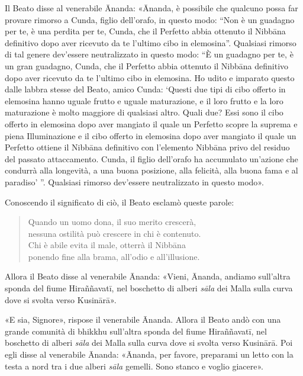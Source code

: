 Il Beato disse al venerabile Ānanda: «Ānanda, è possibile che qualcuno possa far
provare rimorso a Cunda, figlio dell’orafo, in questo modo: “Non è un guadagno
per te, è una perdita per te, Cunda, che il Perfetto abbia ottenuto il Nibbāna
definitivo dopo aver ricevuto da te l’ultimo cibo in elemosina”. Qualsiasi
rimorso di tal genere dev’essere neutralizzato in questo modo: “È un guadagno
per te, è un gran guadagno, Cunda, che il Perfetto abbia ottenuto il Nibbāna
definitivo dopo aver ricevuto da te l’ultimo cibo in elemosina. Ho udito e
imparato questo dalle labbra stesse del Beato, amico Cunda: ‘Questi due tipi di
cibo offerto in elemosina hanno uguale frutto e uguale maturazione, e il loro
frutto e la loro maturazione è molto maggiore di qualsiasi altro. Quali due?
Essi sono il cibo offerto in elemosina dopo aver mangiato il quale un Perfetto
scopre la suprema e piena Illuminazione e il cibo offerto in elemosina dopo aver
mangiato il quale un Perfetto ottiene il Nibbāna definitivo con l’elemento
Nibbāna privo del residuo del passato attaccamento. Cunda, il figlio dell’orafo
ha accumulato un’azione che condurrà alla longevità, a una buona posizione, alla
felicità, alla buona fama e al paradiso’ ”. Qualsiasi rimorso dev’essere
neutralizzato in questo modo».

Conoscendo il significato di ciò, il Beato esclamò queste parole:

\begin{quote}
Quando un uomo dona, il suo merito crescerà, \\
nessuna ostilità può crescere in chi è contenuto. \\
Chi è abile evita il male, otterrà il Nibbāna \\
ponendo fine alla brama, all’odio e all’illusione.
\end{quote}


Allora il Beato disse al venerabile Ānanda: «Vieni, Ānanda, andiamo sull’altra
sponda del fiume Hiraññavatī, nel boschetto di alberi \emph{sāla} dei Malla
sulla curva dove si svolta verso Kusinārā».

«E sia, Signore», rispose il venerabile Ānanda. Allora il Beato andò con una
grande comunità di bhikkhu sull’altra sponda del fiume Hiraññavatī, nel
boschetto di alberi \emph{sāla} dei Malla sulla curva dove si svolta verso
Kusinārā. Poi egli disse al venerabile Ānanda: «Ānanda, per favore, preparami un
letto con la testa a nord tra i due alberi \emph{sāla} gemelli. Sono stanco e
voglio giacere».

